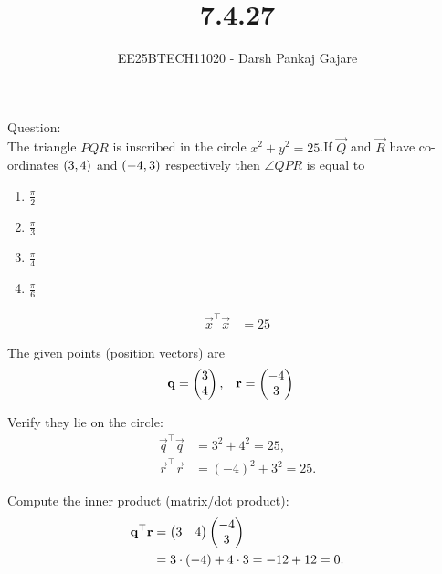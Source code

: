 \documentclass{beamer}
\let\solution\relax
\numberwithin{equation}{section}
\begin{document}
\title{7.4.27}
\author{EE25BTECH11020 - Darsh Pankaj Gajare}
{\let\newpage\relax\maketitle}


Question:\\
The triangle $PQR$ is inscribed in the circle $x^2+y^2=25$.If $\vec{Q}$ and $\vec{R}$ have co-ordinates $\left(3,4\right)$ and $\left(-4,3\right)$ respectively then $\angle QPR$ is equal to
\begin{multicols}{4}
	\begin{enumerate}[label=(\Alph*)]
		\item $\frac{\pi}{2}$
		\item $\frac{\pi}{3}$
		\item $\frac{\pi}{4}$
		\item $\frac{\pi}{6}$
	\end{enumerate}
\end{multicols}
\solution
\begin{table}[H]
	\centering
	\caption{}
	
	\label{}
\end{table}
\begin{align}
\vec{x}^\top\vec{x} &= 25
\end{align}

The given points (position vectors) are
\begin{align}
\mathbf{q} &= \begin{pmatrix}3\\4\end{pmatrix}, & \mathbf{r} &= \begin{pmatrix}-4\\3\end{pmatrix}
\end{align}

Verify they lie on the circle:
\begin{align}
\vec{q}^\top\vec{q} &= 3^2+4^2 = 25, \\
\vec{r}^\top\vec{r} &= (-4)^2+3^2 = 25.
\end{align}

Compute the inner product (matrix/dot product):
\begin{align}
\mathbf{q}^\top\mathbf{r} &= \begin{pmatrix}3 & 4\end{pmatrix}\begin{pmatrix}-4\\3\end{pmatrix} \\
&= 3\cdot(-4) + 4\cdot 3 = -12 + 12 = 0.
\end{align}
\end{document}
